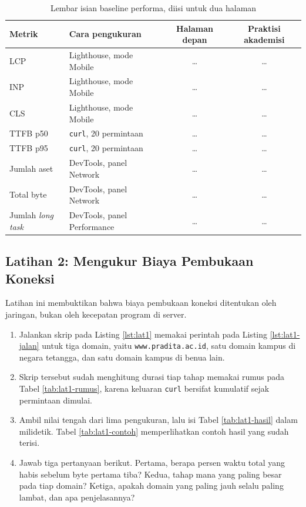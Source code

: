 \begin{table}[!htb]
  \centering
  \caption{Lembar isian baseline performa, diisi untuk dua halaman}
  \label{tab:baseline}
  \begin{tabularx}{\textwidth}{lXcc}
    \hline
    \textbf{Metrik} & \textbf{Cara pengukuran} & \textbf{Halaman depan} & \textbf{Praktisi akademisi} \\
    \hline
    LCP & Lighthouse, mode Mobile & \dots & \dots \\
    \hline
    INP & Lighthouse, mode Mobile & \dots & \dots \\
    \hline
    CLS & Lighthouse, mode Mobile & \dots & \dots \\
    \hline
    TTFB p50 & \texttt{curl}, 20 permintaan & \dots & \dots \\
    \hline
    TTFB p95 & \texttt{curl}, 20 permintaan & \dots & \dots \\
    \hline
    Jumlah aset & DevTools, panel Network & \dots & \dots \\
    \hline
    Total byte & DevTools, panel Network & \dots & \dots \\
    \hline
    Jumlah \textit{long task} & DevTools, panel Performance & \dots & \dots \\
    \hline
  \end{tabularx}
\end{table}

\subsection*{Latihan 2: Mengukur Biaya Pembukaan Koneksi}

Latihan ini membuktikan bahwa biaya pembukaan koneksi ditentukan oleh jaringan,
bukan oleh kecepatan program di server.

\begin{enumerate}
  \item Jalankan skrip pada Listing \ref{lst:lat1} memakai perintah pada
        Listing \ref{lst:lat1-jalan} untuk tiga domain, yaitu
        \texttt{www.pradita.ac.id}, satu domain kampus di negara tetangga, dan
        satu domain kampus di benua lain.
  \item Skrip tersebut sudah menghitung durasi tiap tahap memakai rumus pada
        Tabel \ref{tab:lat1-rumus}, karena keluaran \texttt{curl} bersifat
        kumulatif sejak permintaan dimulai.
  \item Ambil nilai tengah dari lima pengukuran, lalu isi Tabel \ref{tab:lat1-hasil} dalam milidetik. Tabel \ref{tab:lat1-contoh}
        memperlihatkan contoh hasil yang sudah terisi.
  \item Jawab tiga pertanyaan berikut. Pertama, berapa persen waktu total yang
        habis sebelum byte pertama tiba? Kedua, tahap mana yang paling besar
        pada tiap domain? Ketiga, apakah domain yang paling jauh selalu paling
        lambat, dan apa penjelasannya?
\end{enumerate}

